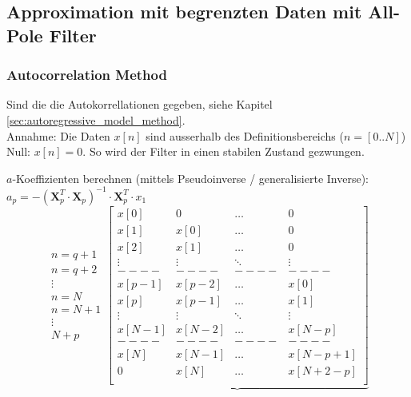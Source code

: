 \subsection{Approximation mit begrenzten  Daten mit All-Pole Filter}
\subsubsection{Autocorrelation Method }
Sind die die Autokorrellationen gegeben, siehe Kapitel \ref{sec:autoregressive_model_method}.\\
Annahme: Die Daten $x[n]$ sind ausserhalb des Definitionsbereichs ($n=[0..N]$) Null: $x[n]=0$. So wird der Filter in einen stabilen Zustand gezwungen.
\renewcommand{\arraystretch}{1.0}

\begin{aufzaehlung}
	\item $a$-Koeffizienten berechnen (mittels Pseudoinverse / generalisierte Inverse): $a_p = -\left(\bm X_p^T \cdot \bm  X_p\right)^{-1} \cdot \bm X_p^T \cdot x_1$
  		 \small
			$$
		\begin{matrix} n=q+1\\ n=q+2\\ \vdots \\ n=N\\ n=N+1\\ \vdots \\ N+p
		\end{matrix}
		\underbrace{\begin{bmatrix}
    		x[0] & 0 & \hdots & 0 \\ 
    		x[1] & x[0] & \hdots & 0 \\ 
    		x[2] & x[1] & \hdots & 0 \\        
    		\vdots & \vdots & \ddots & \vdots \\
    		----&----&----&----\\                
    		x[p-1] & x[p-2] & \hdots & x[0] \\                                   
    		x[p] & x[p-1] & \hdots & x[1] \\      
    		\vdots & \vdots & \ddots & \vdots \\                        
    		x[N-1] & x[N-2] & \hdots & x[N-p] \\ 
    		----&----&----&----\\                            
    		x[N] & x[N-1] & \hdots & x[N-p+1] \\ 
    		0 & x[N] & \hdots & x[N+2-p] \\

\end{bmatrix}}$$
\end{aufzaehlung}
